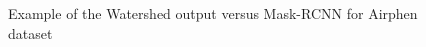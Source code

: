 \documentclass[../thesis.tex]{subfiles}
\begin{document}
\begin{figure}[H]
        
        
        \caption{Example of the Watershed output versus Mask-RCNN for Airphen dataset}
        \label{fig:07-output}
    \end{figure}
    
\end{document}
